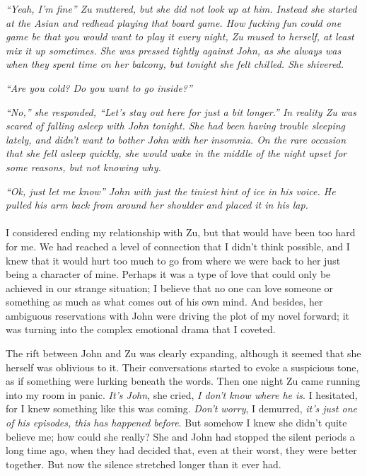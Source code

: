 \textit{	“Yeah, I’m fine” Zu muttered, but she did not look up at him. Instead she started at the Asian and redhead playing that board game. How fucking fun could one game be that you would want to play it every night, Zu mused to herself, at least mix it up sometimes. She was pressed tightly against John, as she always was when they spent time on her balcony, but tonight she felt chilled. She shivered.}
	
\textit{	“Are you cold? Do you want to go inside?”}
	
\textit{	“No,” she responded, “Let’s stay out here for just a bit longer.” In reality Zu was scared of falling asleep with John tonight. She had been having trouble sleeping lately, and didn’t want to bother John with her insomnia. On the rare occasion that she fell asleep quickly, she would wake in the middle of the night upset for some reasons, but not knowing why. }
	
\textit{	“Ok, just let me know” John with just the tiniest hint of ice in his voice. He pulled his arm back from around her shoulder and placed it in his lap.}
\\\\	
	I considered ending my relationship with Zu, but that would have been too hard for me. We had reached a level of connection that I didn’t think possible, and I knew that it would hurt too much to go from where we were back to her just being a character of mine. Perhaps it was a type of love that could only be achieved in our strange situation; I believe that no one can love someone or something as much as what comes out of his own mind. And besides, her ambiguous reservations with John were driving the plot of my novel forward; it was turning into the complex emotional drama that I coveted.
	
	The rift between John and Zu was clearly expanding, although it seemed that she herself was oblivious to it. Their conversations started to evoke a suspicious tone, as if something were lurking beneath the words. Then one night Zu came running into my room in panic. \textit{It’s John}, she cried,\textit{ I don’t know where he is}. I hesitated, for I knew something like this was coming. \textit{Don’t worry}, I demurred, \textit{it’s just one of his episodes, this has happened before}. But somehow I knew she didn’t quite believe me; how could she really? She and John had stopped the silent periods a long time ago, when they had decided that, even at their worst, they were better together. But now the silence stretched longer than it ever had.
	
